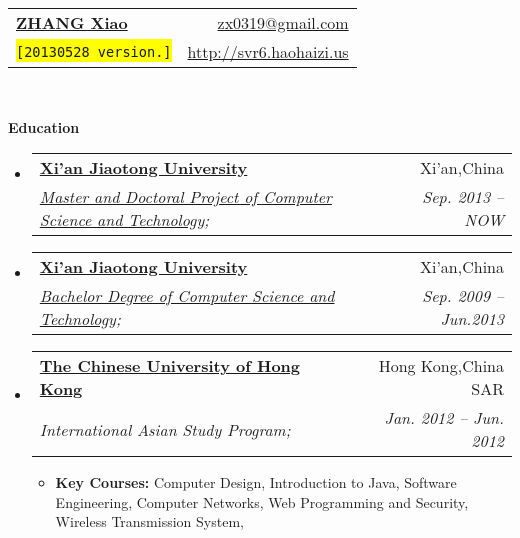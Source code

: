 \documentclass[letterpaper,11pt]{article}
\makeatletter
\newcommand{\resitem}[1]{\item #1 \vspace{-2pt}}
\newcommand{\resheading}[1]{{\large \colorbox{mygrey}{\begin{minipage}{\textwidth}{\textbf{#1 \vphantom{p\^{E}}}}\end{minipage}}}}
\newcommand{\ressubheading}[4]{
\begin{tabular*}{6.5in}{l@{\extracolsep{\fill}}r}
		\textbf{#1} & #2 \\
		\textit{#3} & \textit{#4} \\
\end{tabular*}\vspace{-6pt}}
\makeatother
\begin{document}
\newcommand{\mywebheader}{
\begin{tabular*}{7in}{l@{\extracolsep{\fill}}r}
	\textbf{\href{http://svr6.haohaizi.us/}{\LARGE ZHANG Xiao}} & \href{mailto:zx0319@gmail.com}{zx0319@gmail.com}\\
	{\footnotesize \texttt{\colorbox{yellow}{[20130528 version.]}}} & \href{http://svr6.haohaizi.us}{http://svr6.haohaizi.us} \\
	\end{tabular*}
\\
\vspace{0.1in}}

\mywebheader

\resheading{Education}
	\begin{itemize}
		\item
			\ressubheading{\href{http://www.xjtu.edu.cn}{Xi'an Jiaotong University}}{Xi'an,China}{\href{http://www.cs.xjtu.edu.cn}{Master and Doctoral Project of Computer Science and Technology};}{Sep. 2013 --  NOW}

		\item
			\ressubheading{\href{http://www.xjtu.edu.cn}{Xi'an Jiaotong University}}{Xi'an,China}{\href{http://www.cs.xjtu.edu.cn}{Bachelor Degree of Computer Science and Technology};}{Sep. 2009 --  Jun.2013}
			
		\item
			\ressubheading{\href{http://www.cuhk.edu.hk}{The Chinese University of Hong Kong}}{Hong Kong,China SAR}{{International Asian Study Program};}{Jan. 2012 -- Jun. 2012}
				{ \footnotesize
				\begin{itemize}
					\resitem
					{\textbf{Key Courses:}
						{Computer Design},
						{Introduction to Java},
						{Software Engineering},
						{Computer Networks},
						{Web Programming and Security},
						{Wireless Transmission System},
					}
				\end{itemize}
			}
	\end{itemize} %
\end{document}
